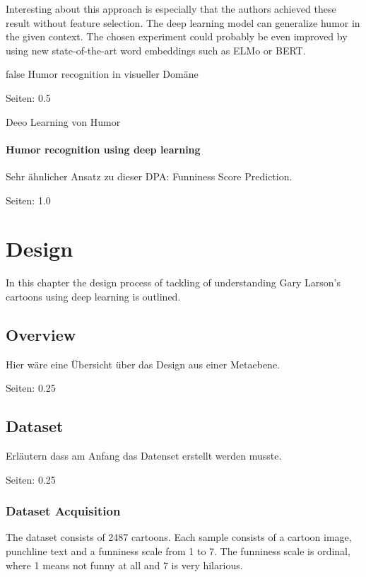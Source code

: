 \documentclass[draft,final,oneside]{vutinfth} %
\begin{document}
Interesting about this approach is especially that the authors achieved these result without feature selection. The deep learning model can generalize humor in the given context. The chosen experiment could probably be even improved by using new state-of-the-art word embeddings such as ELMo or BERT. \cite{elmo} \cite{bert}

\if false
Humor recognition in visueller Domäne

\cite{chen2017convolutional}

Seiten: 0.5


Deeo Learning von Humor 

\cite{chen2018humor}



\subsubsection{Humor recognition using deep learning}

Sehr ähnlicher Ansatz zu dieser DPA: Funniness Score Prediction.

\cite{chiruzzo2019overview}

Seiten: 1.0
\fi

\chapter{Design} \label{design}

In this chapter the design process of tackling of understanding Gary Larson's cartoons using deep learning is outlined.

\section{Overview}

Hier wäre eine Übersicht über das Design aus einer Metaebene.

Seiten: 0.25

\section{Dataset}

Erläutern dass am Anfang das Datenset erstellt werden musste.

Seiten: 0.25

\subsection{Dataset Acquisition}
The dataset consists of 2487 cartoons. Each sample consists of a cartoon image, punchline text and a funniness scale from 1 to 7. The funniness scale is ordinal, where 1 means not funny at all and 7 is very hilarious.
\end{document}
